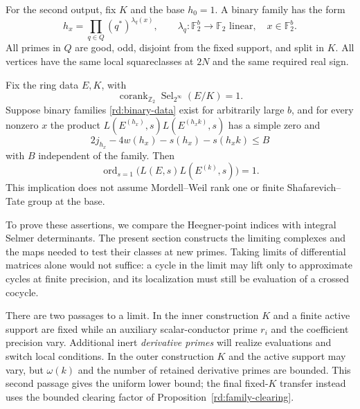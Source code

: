 For the second output, fix $K$ and the base $h_0=1$.  A binary family
has the form
\begin{equation}
 h_x=\prod_{q\in Q}(q^*)^{\lambda_q(x)},\qquad
 \lambda_q:\mathbb F_2^b\longrightarrow\mathbb F_2\text{ linear},
 \quad x\in\mathbb F_2^b.
 \label{rd:binary-data}
\end{equation}
All primes in $Q$ are good, odd, disjoint from the fixed support, and
split in $K$.  All vertices have the same local squareclasses at $2N$
and the same required real sign.

\begin{theorem}
\label{rd:missing-vertex}
Fix the ring data \(E,K\), with
\begin{equation}
 \operatorname{corank}_{\mathbb Z_2}
       \operatorname{Sel}_{2^\infty}(E/K)=1.
 \label{rd:base-corank}
\end{equation}
Suppose binary families \eqref{rd:binary-data}
exist for arbitrarily large \(b\), and for
every nonzero \(x\) the product
\(L(E^{(h_x)},s)L(E^{(h_xk)},s)\) has a simple zero and
\begin{equation}
 2j_{h_x}-4w(h_x)-s(h_x)-s(h_xk)\le B
 \label{rd:nonzero-bound}
\end{equation}
with \(B\) independent of the family.  Then
\begin{equation}
 \operatorname{ord}_{s=1}
      \bigl(L(E,s)L(E^{(k)},s)\bigr)=1.
 \label{rd:missing-conclusion}
\end{equation}
This implication does not assume Mordell--Weil
rank one or finite Shafarevich--Tate group
at the base.
\end{theorem}

To prove these assertions, we compare the Heegner-point indices with
integral Selmer determinants.  The present section constructs the
limiting complexes and the maps needed to test their classes at new
primes.  Taking limits of differential matrices alone would not suffice:
a cycle in the limit may lift only to approximate cycles at finite
precision, and its localization must still be evaluation of a crossed
cocycle.

There are two passages to a limit.  In the inner construction $K$ and a
finite active support are fixed while an auxiliary scalar-conductor
prime $r_i$ and the coefficient precision vary.  Additional inert
\emph{derivative primes} will realize evaluations and switch local
conditions.  In the outer construction $K$ and the active support may
vary, but $\omega(k)$ and the number of retained derivative primes are
bounded.  This second passage gives the uniform lower bound; the final
fixed-$K$ transfer instead uses the bounded clearing factor of
Proposition~\ref{rd:family-clearing}.

